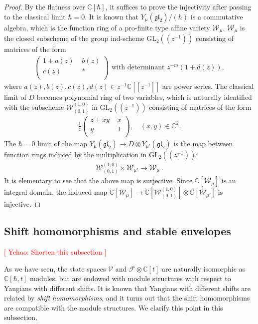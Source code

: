 \documentclass[10pt]{amsart}
\theoremstyle{definition}
\numberwithin{equation}{section}
\newcommand{\GL}{\mathrm{GL}}
\newcommand{\bC}{\mathbb{C}}
\newcommand{\cF}{\mathcal{F}}
\newcommand{\cV}{\mathcal{V}}
\newcommand{\cW}{\mathcal{W}}
\newcommand{\yh}[1]{\textcolor{red}{$[$ Yehao: #1 $]$}}
\begin{document}
\begin{proof}
By the flatness over $\bC[\hbar]$, it suffices to prove the injectivity after passing to the classical limit $\hbar=0$. It is known that $Y_{\mu}(\mathfrak{gl}_2)/(\hbar)$ is a commutative algebra, which is the function ring of a pro-finite type affine variety $\cW_{\mu}$. $\cW_{\mu}$ is the closed subscheme of the group ind-scheme $\GL_2(\!(z^{-1})\!)$ consisting of matrices of the form
\begin{align*}
\left(
\begin{array}{cc}
 1+a(z) & \,\, b(z) \\
 c(z) & \,\,*\\
\end{array}
\right)\text{ with determinant } z^{-m}(1+d(z)),
\end{align*}
where $a(z),b(z),c(z),d(z)\in z^{-1}\bC[\![z^{-1}]\!]$ are power series. The classical limit of $D$ becomes polynomial ring of two variables, which is naturally identified with the subscheme $\cW^{(1,0)}_{(0,1)}$ in $\GL_2(\!(z^{-1})\!)$ consisting of matrices of the form
\begin{align*}
\frac{1}{z}
\left(
\begin{array}{cc}
 z+xy & \,\, x \\
 y & \,\, 1\\
\end{array}
\right),\quad (x,y)\in \bC^2.
\end{align*}
The $\hbar=0$ limit of the map $Y_{\mu}(\mathfrak{gl}_2)\to D\otimes Y_{\mu'}(\mathfrak{gl}_2)$ is the map between function rings induced by the multiplication in $\GL_2(\!(z^{-1})\!)$:
\begin{align*}
    \cW^{(1,0)}_{(0,1)}\times \cW_{\mu'}\to\cW_{\mu}\:.
\end{align*}
It is elementary to see that the above map is surjective. Since $\bC[\cW_{\mu}]$ is an integral domain, the induced map $\bC[\cW_{\mu}]\to \bC\left[\cW^{(1,0)}_{(0,1)}\right]\otimes \bC[\cW_{\mu'}]$ is injective.
\end{proof}




\iffalse

\subsection{Shift homomorphisms and stable envelopes}


\yh{Shorten this subsection}

As we have seen, the state spaces $\cV$ and $\cF\otimes\bC[t]$ are naturally isomorphic as $\bC[\hbar,t]$ modules, but are endowed with module structures with respect to Yangians with different shifts. It is known that Yangians with different shifts are related by \textit{shift homomorphisms}, and it turns out that the shift homomorphisms are compatible with the module structures. We clarify this point in this subsection.
\end{document}
